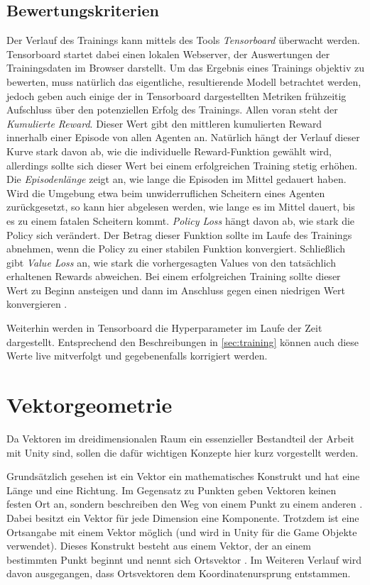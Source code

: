 \subsection{Bewertungskriterien}
Der Verlauf des Trainings kann mittels des Tools \emph{Tensorboard} überwacht werden.
Tensorboard startet dabei einen lokalen Webserver, der Auswertungen der Trainingsdaten im Browser darstellt.
Um das Ergebnis eines Trainings objektiv zu bewerten, muss natürlich das eigentliche, resultierende Modell betrachtet werden, jedoch geben auch einige der in Tensorboard dargestellten Metriken frühzeitig Aufschluss über den potenziellen Erfolg des Trainings.
Allen voran steht der \emph{Kumulierte Reward}.
Dieser Wert gibt den mittleren kumulierten Reward innerhalb einer Episode von allen Agenten an.
Natürlich hängt der Verlauf dieser Kurve stark davon ab, wie die individuelle Reward-Funktion gewählt wird, allerdings sollte sich dieser Wert bei einem erfolgreichen Training stetig erhöhen.
Die \emph{Episodenlänge} zeigt an, wie lange die Episoden im Mittel gedauert haben.
Wird die Umgebung etwa beim unwiderruflichen Scheitern eines Agenten zurückgesetzt, so kann hier abgelesen werden, wie lange es im Mittel dauert, bis es zu einem fatalen Scheitern kommt.
\emph{Policy Loss} hängt davon ab, wie stark die Policy sich verändert.
Der Betrag dieser Funktion sollte im Laufe des Trainings abnehmen, wenn die Policy zu einer stabilen Funktion konvergiert.
Schließlich gibt \emph{Value Loss} an, wie stark die vorhergesagten Values von den tatsächlich erhaltenen Rewards abweichen.
Bei einem erfolgreichen Training sollte dieser Wert zu Beginn ansteigen und dann im Anschluss gegen einen niedrigen Wert konvergieren \cite{aurelian2018,untiyMetrics}.

Weiterhin werden in Tensorboard die Hyperparameter im Laufe der Zeit dargestellt.
Entsprechend den Beschreibungen in \autoref{sec:training} können auch diese Werte live mitverfolgt und gegebenenfalls korrigiert werden.


\section{Vektorgeometrie}
Da Vektoren im dreidimensionalen Raum ein essenzieller Bestandteil der Arbeit mit Unity sind, sollen die dafür wichtigen Konzepte hier kurz vorgestellt werden.

Grundsätzlich gesehen ist ein Vektor ein mathematisches Konstrukt und hat eine Länge und eine Richtung.
Im Gegensatz zu Punkten geben Vektoren keinen festen Ort an, sondern beschreiben den Weg von einem Punkt zu einem anderen \cite[6]{kohn2012}.
Dabei besitzt ein Vektor für jede Dimension eine Komponente.
Trotzdem ist eine Ortsangabe mit einem Vektor möglich (und wird in Unity für die Game Objekte verwendet).
Dieses Konstrukt besteht aus einem Vektor, der an einem bestimmten Punkt beginnt und nennt sich Ortsvektor \cite[21]{kohn2012}.
Im Weiteren Verlauf wird davon ausgegangen, dass Ortsvektoren dem Koordinatenursprung entstammen.

